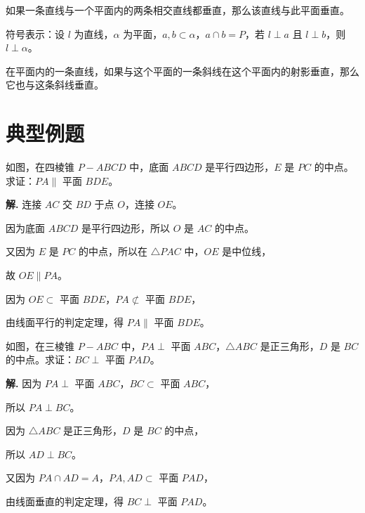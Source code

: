 \documentclass[11pt]{ctexrep}
\begin{document}
\begin{property}[线面垂直的判定定理]
    如果一条直线与一个平面内的两条相交直线都垂直，那么该直线与此平面垂直。
    
    符号表示：设 $l$ 为直线，$\alpha$ 为平面，$a, b \subset \alpha$，$a \cap b = P$，若 $l \perp a$ 且 $l \perp b$，则 $l \perp \alpha$。
\end{property}

\begin{property}[三垂线定理]
    在平面内的一条直线，如果与这个平面的一条斜线在这个平面内的射影垂直，那么它也与这条斜线垂直。
\end{property}

\section*{典型例题}

\begin{example}[线面平行证明]
    如图，在四棱锥 $P-ABCD$ 中，底面 $ABCD$ 是平行四边形，$E$ 是 $PC$ 的中点。求证：$PA \parallel$ 平面 $BDE$。
\end{example}

\textbf{解.} 连接 $AC$ 交 $BD$ 于点 $O$，连接 $OE$。

因为底面 $ABCD$ 是平行四边形，所以 $O$ 是 $AC$ 的中点。

又因为 $E$ 是 $PC$ 的中点，所以在 $\triangle PAC$ 中，$OE$ 是中位线，

故 $OE \parallel PA$。

因为 $OE \subset$ 平面 $BDE$，$PA \not\subset$ 平面 $BDE$，

由线面平行的判定定理，得 $PA \parallel$ 平面 $BDE$。

\begin{example}[线面垂直证明]
    如图，在三棱锥 $P-ABC$ 中，$PA \perp$ 平面 $ABC$，$\triangle ABC$ 是正三角形，$D$ 是 $BC$ 的中点。求证：$BC \perp$ 平面 $PAD$。
\end{example}

\textbf{解.} 因为 $PA \perp$ 平面 $ABC$，$BC \subset$ 平面 $ABC$，

所以 $PA \perp BC$。

因为 $\triangle ABC$ 是正三角形，$D$ 是 $BC$ 的中点，

所以 $AD \perp BC$。

又因为 $PA \cap AD = A$，$PA, AD \subset$ 平面 $PAD$，

由线面垂直的判定定理，得 $BC \perp$ 平面 $PAD$。
\end{document}

